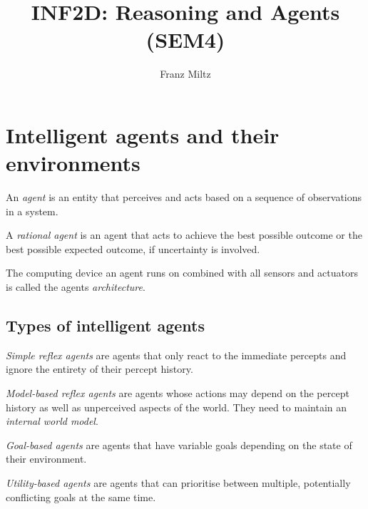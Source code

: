 \documentclass{article}
\title{INF2D: Reasoning and Agents (SEM4)}
\author{Franz Miltz}
\begin{document}
\maketitle
\tableofcontents
\pagebreak

\section{Intelligent agents and their environments}

\begin{definition}
    An \emph{agent} is an entity that perceives and
    acts based on a sequence of observations in a system.
\end{definition}

\begin{definition}
    A \emph{rational agent} is an agent that acts to achieve
    the best possible outcome or the best possible expected
    outcome, if uncertainty is involved.
\end{definition}

\begin{definition}
    The computing device an agent runs on combined with all sensors and actuators
    is called the agents \emph{architecture}.
\end{definition}

\subsection{Types of intelligent agents}

\begin{definition}
    \emph{Simple reflex agents} are agents that only react to the immediate percepts
    and ignore the entirety of their percept history.
\end{definition}

\begin{definition}
    \emph{Model-based reflex agents} are agents whose actions may depend on the
    percept history as well as unperceived aspects of the world. They need to
    maintain an \emph{internal world model}.
\end{definition}

\begin{definition}
    \emph{Goal-based agents} are agents that have variable goals depending on the
    state of their environment.
\end{definition}

\begin{definition}
    \emph{Utility-based agents} are agents that can prioritise between multiple, 
    potentially conflicting goals at the same time.
\end{definition}
\end{document}
